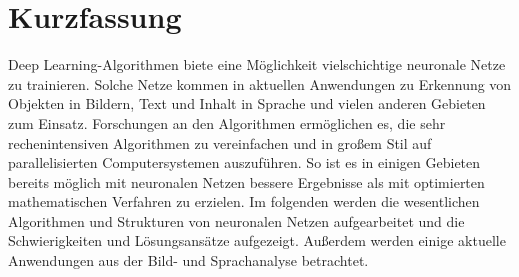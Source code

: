 \chapter{Kurzfassung}

Deep Learning-Algorithmen biete eine Möglichkeit vielschichtige neuronale Netze zu trainieren. Solche Netze kommen in aktuellen Anwendungen zu Erkennung von Objekten in Bildern, Text und Inhalt in Sprache und vielen anderen Gebieten zum Einsatz. Forschungen an den Algorithmen ermöglichen es, die sehr rechenintensiven Algorithmen zu vereinfachen und in großem Stil auf parallelisierten Computersystemen auszuführen. So ist es in einigen Gebieten bereits möglich mit neuronalen Netzen bessere Ergebnisse als mit optimierten mathematischen Verfahren zu erzielen. Im folgenden werden die wesentlichen Algorithmen und Strukturen von neuronalen Netzen aufgearbeitet und die Schwierigkeiten und Lösungsansätze aufgezeigt. Außerdem werden einige aktuelle Anwendungen aus der Bild- und Sprachanalyse betrachtet.
